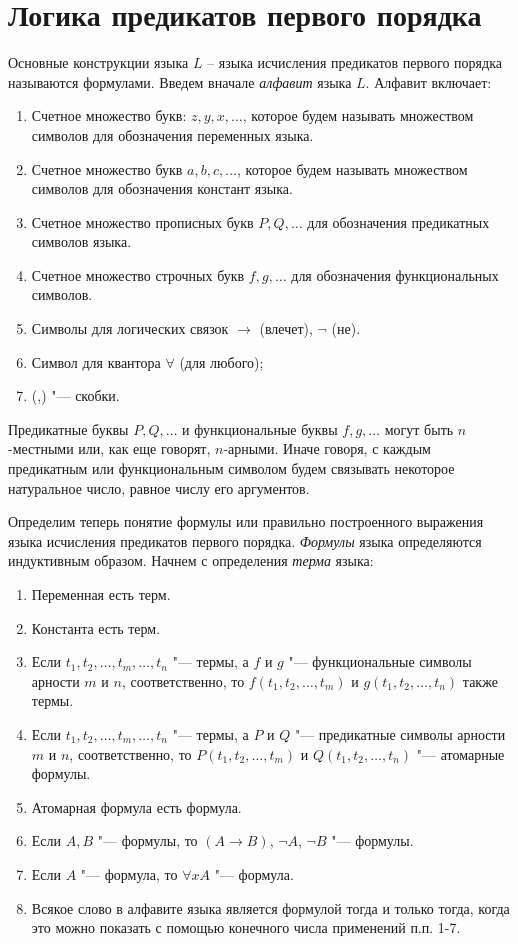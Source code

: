 \documentclass[b5paper,11pt]{book}
\begin{document}
	\section{Логика предикатов первого порядка}
	Основные конструкции языка $L$ – языка исчисления предикатов первого порядка называются формулами. Введем вначале \textit{алфавит} языка $L$. Алфавит включает:
	\begin{enumerate}
		\item Счетное множество букв: $z,y,x,\dots$, которое будем называть множеством символов для обозначения переменных языка.
		\item Счетное множество букв $a,b,c,\dots$, которое будем называть множеством символов для обозначения констант языка.
		\item Счетное множество прописных букв $P,Q,\dots$ для обозначения предикатных символов языка.
		\item Счетное множество строчных букв $f,g,\dots$ для обозначения функциональных символов.
		\item Символы для логических связок $\rightarrow$ (влечет), $\neg$ (не).
		\item Символ для квантора $\forall$ (для любого);
		\item (,) "--- скобки.
	\end{enumerate}
	
	Предикатные буквы $P,Q,\dots$ и функциональные буквы $f,g,\dots$ могут быть $n$-местными или, как еще говорят, $n$-арными. Иначе говоря, с каждым предикатным или функциональным символом будем связывать некоторое натуральное число, равное числу его аргументов.
	
	Определим теперь понятие формулы или правильно построенного выражения языка исчисления предикатов первого порядка. \textit{Формулы} языка определяются индуктивным образом. Начнем с определения \textit{терма} языка:
	\begin{enumerate}
		\item Переменная есть терм.
		\item Константа есть терм.
		\item Если $t_1,t_2,\dots,t_m,\dots,t_n$ "--- термы, а $f$ и $g$ "--- функциональные символы арности $m$ и $n$, соответственно, то  $f(t_1,t_2,\dots,t_m)$ и $g(t_1,t_2,\dots,t_n)$ также термы.
		\item Если $t_1,t_2,\dots,t_m,\dots,t_n$ "--- термы, а $P$ и $Q$ "--- предикатные символы арности $m$ и $n$, соответственно, то $P(t_1,t_2,\dots,t_m)$ и $Q(t_1,t_2,\dots,t_n)$ "--- атомарные формулы.
		\item Атомарная формула есть формула.
		\item Если $A,B$ "--- формулы, то $(A\rightarrow B)$, $\neg A$, $\neg B$ "--- формулы.
		\item Если $A$ "--- формула, то $\forall x A$ "--- формула.
		\item Всякое слово в алфавите языка является формулой тогда и только тогда, когда это можно показать с помощью конечного числа применений п.п. 1-7.
	\end{enumerate}
\end{document}
